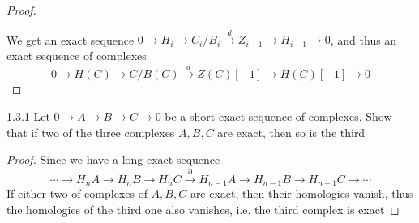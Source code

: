 \documentclass[../main.tex]{subfiles}
\begin{document}
\begin{proof}
\begin{center}
\end{center}
We get an exact sequence $0\to H_i\to C_i/B_i\xrightarrow{d} Z_{i-1}\to H_{i-1}\to0$, and thus an exact sequence of complexes
\[0\to H(C)\to C/B(C)\xrightarrow{d}Z(C)[-1]\to H(C)[-1]\to0\]
\end{proof}

\begin{customexercise}{1.3.1}
Let $0\to A\to B\to C\to 0$ be a short exact sequence of complexes. Show that if two of the three complexes $A,B,C$ are exact, then so is the third
\end{customexercise}

\begin{proof}
Since we have a long exact sequence
\[\cdots\to H_nA\to H_nB\to H_nC\xrightarrow{\partial}H_{n-1}A\to H_{n-1}B\to H_{n-1}C\to\cdots\]
If either two of complexes of $A,B,C$ are exact, then their homologies vanish, thus the homologies of the third one also vanishes, i.e. the third complex is exact
\end{proof}
\end{document}
